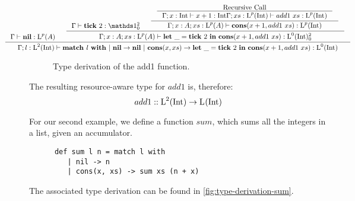 \begin{example}
\begin{figure}[H]
\begin{center}
   \[
      \hspace*{-2.5cm}
      \inference
      {
         \typing{\Gamma}{\listnil}{\ralist{p}{A}} 
         &
         \inference
         {
            \typing{\Gamma}{\tick{2}}{\ratype{\unit}{2}{0}}
            &
            \inference
            {
               \inference
               {
                  \text{Recursive Call}
               }
               {
                  \typing{\Gamma;x:\typeint}{x + 1}{\typeint}
                  \typing{\Gamma;xs:\ralist{p}{\typeint}}{add1~xs}{\ralist{p}{\typeint}}
               }
            }
            {
               \typing{\Gamma;x:A;xs:\ralist{p}{A}}{\cons{x + 1}{add1~xs}}{\ralist{p}{\typeint}}
            }
         }
         {
            \typing{\Gamma;x:A;xs:\ralist{p}{A}}{\letexp{\_}{\tick{2}}{\cons{x+1}{add1~xs}}}{\ratype{\ralist{0}{\typeint}}{2}{0}}
         }
      }
      {
         \typing{\Gamma;l : \ralist{2}{\typeint}}{\listmatch{l}{\listnil}{\letexp{\_}{\tick{2}}{\cons{x+1}{add1~xs}}}}{\ralist{0}{\typeint}}
      }
   \]
   \end{center}
   \caption{Type derivation of the add1 function.}
   \label{fig:type-derivation-add1}
\end{figure}

The resulting resource-aware type for \(add1\) is, therefore:
\[
   add1 :: \text{L}^{2}(\text{Int}) \to \text{L}^{}(\text{Int}) ^{}_{}
\]
\end{example}

\begin{example}
   For our second example, we define a function \(sum\), which sums all the integers in a list, given an accumulator. 
   \begin{verbatim}
      def sum l n = match l with 
         | nil -> n
         | cons(x, xs) -> sum xs (n + x)
   \end{verbatim}
\end{example}

The associated type derivation can be found in \cref{fig:type-derivation-sum}. 

